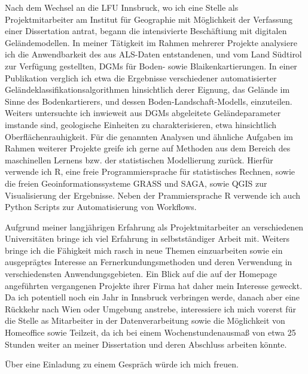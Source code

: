 \documentclass[11pt,a4paper,sans]{moderncv}        %
\begin{document}
Nach dem Wechsel an die LFU Innsbruck, wo ich eine Stelle als Projektmitarbeiter am Institut f\"{u}r Geographie mit M\"{o}glichkeit der Verfassung einer Dissertation antrat, begann die intensivierte Besch\"{a}ftiung mit digitalen Gel\"andemodellen. In meiner T\"{a}tigkeit im Rahmen mehrerer Projekte analysiere ich die Anwendbarkeit des aus ALS-Daten entstandenen, und vom Land S\"udtirol zur Verf\"{u}gung gestellten, DGMs f\"ur Boden- sowie Blaikenkartierungen. In einer Publikation verglich ich etwa die Ergebnisse verschiedener automatisierter Gel\"{a}ndeklassifikationsalgorithmen hinsichtlich derer Eignung, das Gel\"{a}nde im Sinne des Bodenkartierers, und dessen Boden-Landschaft-Modells, einzuteilen. Weiters untersuchte ich inwieweit aus DGMs abgeleitete Gel\"{a}ndeparameter imstande sind, geologische Einheiten zu charakterisieren, etwa hinsichtlich Oberfl\"{a}chenrauhigkeit. F\"{u}r die genannten Analysen und \"{a}hnliche Aufgaben im Rahmen weiterer Projekte greife ich gerne auf Methoden aus dem Bereich des maschinellen Lernens bzw. der statistischen Modellierung zur\"{u}ck. Hierf\"{u}r verwende ich R, eine freie Programmiersprache f\"{u}r statistisches Rechnen, sowie die freien Geoinformationssysteme  GRASS und SAGA, sowie QGIS zur Visualisierung der Ergebnisse. Neben der Prammiersprache R  verwende ich auch Python Scripts zur Automatisierung von Workflows.

Aufgrund meiner langj\"{a}hrigen Erfahrung als Projektmitarbeiter an verschiedenen Universit\"{a}ten bringe ich viel Erfahrung in selbstst\"{a}ndiger Arbeit mit. Weiters bringe ich die F\"{a}higkeit mich rasch in neue Themen einzuarbeiten sowie ein ausgepr\"{a}gtes Interesse an Fernerkundungsmethoden und deren Verwendung in verschiedensten Anwendungsgebieten. Ein Blick auf die auf der Homepage angef\"{u}hrten vergangenen Projekte ihrer Firma hat daher mein Interesse geweckt. Da ich potentiell noch ein Jahr in Innsbruck verbringen werde, danach aber eine R\"uckkehr nach Wien oder Umgebung anstrebe, interessiere ich mich vorerst f\"{u}r die Stelle as Mitarbeiter in der Datenverarbeitung sowie die M\"{o}glichkeit von Homeoffice sowie Teilzeit, da ich bei einem Wochenstundenausma{\ss} von etwa 25 Stunden weiter an meiner Dissertation und deren Abschluss arbeiten k\"onnte. 

\"{U}ber eine Einladung zu einem Gespr\"ach w\"urde ich mich freuen.

\makeletterclosing
\clearpage
\makecvtitle
\end{document}
